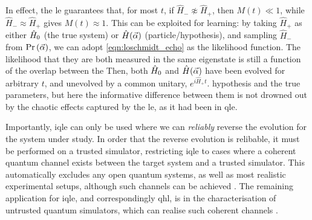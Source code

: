 \par 
In effect, the \gls{le} guarantees that, for most $t$, if $\hat{H}_{-} \not\approx \hat{H}_{+}$, then $M(t) \ll 1$, 
    while $\hat{H}_{-} \approx \hat{H}_{+}$ gives $M(t) \approx 1$. 
This can be exploited for learning: 
    by taking $\hat{H}_{+}$ as either $\hat{H}_0$ (the true system) or $\hat{H}(\vec{\alpha})$ (particle/hypothesis), 
    and sampling $\hat{H}_{-}$ from $\Pr\left(\vec{\alpha}\right)$, 
    we can adopt \cref{eqn:loschmidt_echo} as the \gls{likelihood} function.
    The likelihood that they are both measured in the same eigenstate is still a function of the overlap between the 
Then, both $\hat{H}_0$ and $\hat{H}(\vec{\alpha})$ have been evolved for arbitrary $t$, and unevolved by a common unitary, $e^{i\hat{H}_+ t}$.
    hypothesis and the true parameters, but here the informative difference between them is not drowned out by the chaotic effects captured by the \gls{le},
    as it had been in \gls{qle}.
\par 

Importantly, \gls{iqle} can only be used where we can \emph{reliably} reverse the evolution for the system under study. 
In order that the reverse evolution is relibable, it must be performed on a trusted simulator, 
    restricting \gls{iqle} to cases where a coherent quantum channel exists between the target
    system and a trusted simulator. 
This automatically excludes any open quantum systems, as well as most realistic 
    experimental setups, although such channels can be achieved \cite{hensen2015loophole}. 
The remaining application for \gls{iqle}, and correspondingly \gls{qhl}, 
    is in the characterisation of untrusted quantum simulators, 
    which can realise such coherent channels \cite{wang2017experimental}. 

